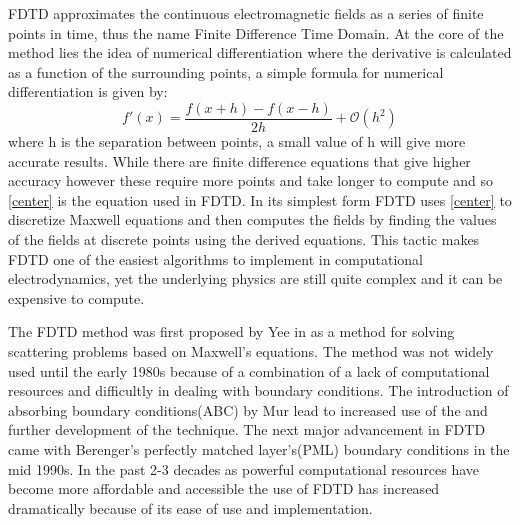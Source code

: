 \documentclass[twocolumn]{article}
\begin{document}
FDTD approximates the continuous electromagnetic fields as a series of finite points in time, thus
the name Finite Difference Time Domain. At the core of the method lies the idea of numerical
differentiation where the derivative is calculated as a function of the surrounding points, a simple
formula for numerical differentiation is given by:
\begin{equation} \label{center}
f'(x)=\frac{f(x+h)-f(x-h)}{2h}+\mathscr{O}(h^2)
\end{equation}
where h is the separation between points, a small value of h will give more accurate results. While
there are finite difference equations that give higher accuracy however these require more points
and take longer to compute and so \eqref{center} is the equation used in FDTD. In its simplest form
FDTD uses \eqref{center} to discretize Maxwell equations and then computes the fields by finding the
values of the fields at discrete points using the derived equations. This tactic makes FDTD one of
the easiest algorithms to implement in computational electrodynamics, yet the underlying physics are
still quite complex and it can be expensive to compute.\cite{ebook}

The FDTD method was first proposed by Yee in \cite{yee66} as a method for solving scattering
problems based on Maxwell's equations. The method was not widely used until the early 1980s because
of a combination of a lack of computational resources and difficultly in dealing with boundary
conditions. The introduction of absorbing boundary conditions(ABC) by Mur \cite{abcsimple} lead to
increased use of the and further development of the technique. The next major advancement in FDTD
came with Berenger's perfectly matched layer's(PML) boundary conditions \cite{berenger-pml} in the
mid 1990s. In the past 2-3 decades as powerful computational resources have become more affordable
and accessible the use of FDTD has increased dramatically because of its ease of use and
implementation.
\end{document}
